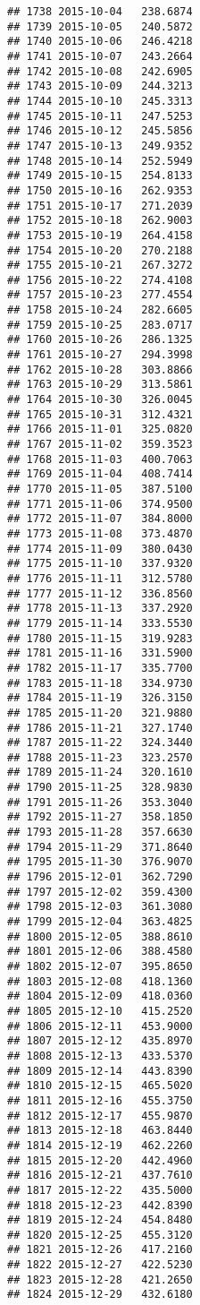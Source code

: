 \documentclass[
]{article}
\begin{document}
\begin{verbatim}
## 1738 2015-10-04   238.6874
## 1739 2015-10-05   240.5872
## 1740 2015-10-06   246.4218
## 1741 2015-10-07   243.2664
## 1742 2015-10-08   242.6905
## 1743 2015-10-09   244.3213
## 1744 2015-10-10   245.3313
## 1745 2015-10-11   247.5253
## 1746 2015-10-12   245.5856
## 1747 2015-10-13   249.9352
## 1748 2015-10-14   252.5949
## 1749 2015-10-15   254.8133
## 1750 2015-10-16   262.9353
## 1751 2015-10-17   271.2039
## 1752 2015-10-18   262.9003
## 1753 2015-10-19   264.4158
## 1754 2015-10-20   270.2188
## 1755 2015-10-21   267.3272
## 1756 2015-10-22   274.4108
## 1757 2015-10-23   277.4554
## 1758 2015-10-24   282.6605
## 1759 2015-10-25   283.0717
## 1760 2015-10-26   286.1325
## 1761 2015-10-27   294.3998
## 1762 2015-10-28   303.8866
## 1763 2015-10-29   313.5861
## 1764 2015-10-30   326.0045
## 1765 2015-10-31   312.4321
## 1766 2015-11-01   325.0820
## 1767 2015-11-02   359.3523
## 1768 2015-11-03   400.7063
## 1769 2015-11-04   408.7414
## 1770 2015-11-05   387.5100
## 1771 2015-11-06   374.9500
## 1772 2015-11-07   384.8000
## 1773 2015-11-08   373.4870
## 1774 2015-11-09   380.0430
## 1775 2015-11-10   337.9320
## 1776 2015-11-11   312.5780
## 1777 2015-11-12   336.8560
## 1778 2015-11-13   337.2920
## 1779 2015-11-14   333.5530
## 1780 2015-11-15   319.9283
## 1781 2015-11-16   331.5900
## 1782 2015-11-17   335.7700
## 1783 2015-11-18   334.9730
## 1784 2015-11-19   326.3150
## 1785 2015-11-20   321.9880
## 1786 2015-11-21   327.1740
## 1787 2015-11-22   324.3440
## 1788 2015-11-23   323.2570
## 1789 2015-11-24   320.1610
## 1790 2015-11-25   328.9830
## 1791 2015-11-26   353.3040
## 1792 2015-11-27   358.1850
## 1793 2015-11-28   357.6630
## 1794 2015-11-29   371.8640
## 1795 2015-11-30   376.9070
## 1796 2015-12-01   362.7290
## 1797 2015-12-02   359.4300
## 1798 2015-12-03   361.3080
## 1799 2015-12-04   363.4825
## 1800 2015-12-05   388.8610
## 1801 2015-12-06   388.4580
## 1802 2015-12-07   395.8650
## 1803 2015-12-08   418.1360
## 1804 2015-12-09   418.0360
## 1805 2015-12-10   415.2520
## 1806 2015-12-11   453.9000
## 1807 2015-12-12   435.8970
## 1808 2015-12-13   433.5370
## 1809 2015-12-14   443.8390
## 1810 2015-12-15   465.5020
## 1811 2015-12-16   455.3750
## 1812 2015-12-17   455.9870
## 1813 2015-12-18   463.8440
## 1814 2015-12-19   462.2260
## 1815 2015-12-20   442.4960
## 1816 2015-12-21   437.7610
## 1817 2015-12-22   435.5000
## 1818 2015-12-23   442.8390
## 1819 2015-12-24   454.8480
## 1820 2015-12-25   455.3120
## 1821 2015-12-26   417.2160
## 1822 2015-12-27   422.5230
## 1823 2015-12-28   421.2650
## 1824 2015-12-29   432.6180

\end{verbatim}
\end{document}
